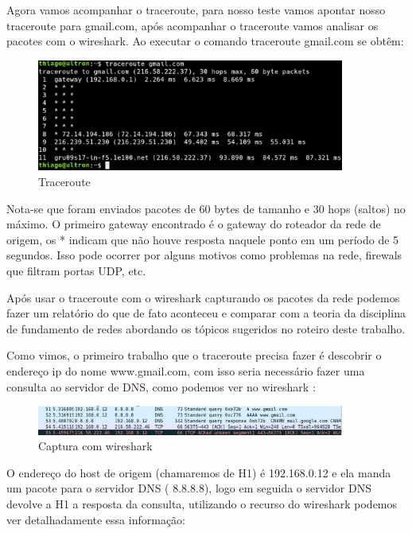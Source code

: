 Agora vamos acompanhar o traceroute, para nosso teste vamos apontar nosso
traceroute para gmail.com, após acompanhar o traceroute vamos analisar os
pacotes com o wireshark. Ao executar o comando traceroute gmail.com se obtêm:

\begin{figure}[h]
  \centering
  \includegraphics[width=0.9\textwidth]{figuras/f3.eps}
  \caption{Traceroute}
  \label{fig:f3}
\end{figure}

Nota-se que foram enviados pacotes de 60 bytes de tamanho e 30 hops (saltos) no
máximo. O primeiro gateway encontrado é o gateway do roteador da rede de origem,
os * indicam que não houve resposta naquele ponto em um período de 5 segundos.
Isso pode ocorrer por alguns motivos como problemas na rede, firewals que filtram
portas UDP, etc.

Após usar o traceroute com o wireshark capturando os pacotes da rede podemos fazer
um relatório do que de fato aconteceu e comparar com a teoria da disciplina de
fundamento de redes abordando os tópicos sugeridos no roteiro deste trabalho.

Como vimos, o primeiro trabalho que o traceroute precisa fazer é descobrir o
endereço ip do nome www.gmail.com, com isso seria necessário fazer uma consulta
ao servidor de DNS, como podemos ver no wireshark :

\begin{figure}[h]
  \centering
  \includegraphics[width=0.9\textwidth]{figuras/f4.eps}
  \caption{Captura com wireshark}
  \label{fig:f4}
\end{figure}

O endereço do host de origem (chamaremos de H1) é 192.168.0.12 e ela manda um
pacote para o servidor DNS ( 8.8.8.8), logo em seguida o servidor DNS devolve
a H1 a resposta da consulta, utilizando o recurso do wireshark podemos ver
detalhadamente essa informação:

